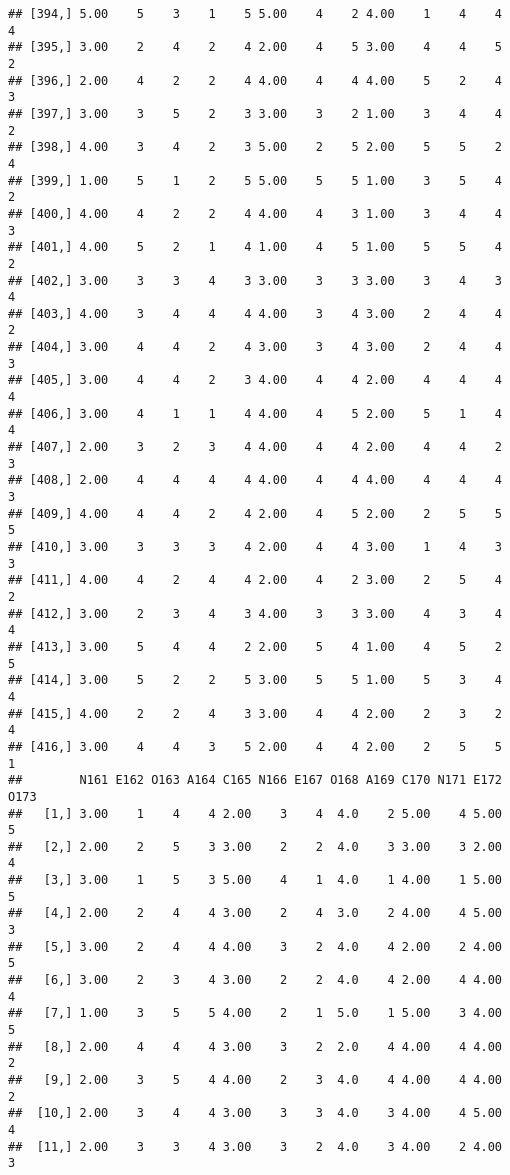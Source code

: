 \documentclass[]{article}
\begin{document}
\begin{verbatim}
## [394,] 5.00    5    3    1    5 5.00    4    2 4.00    1    4    4    4
## [395,] 3.00    2    4    2    4 2.00    4    5 3.00    4    4    5    2
## [396,] 2.00    4    2    2    4 4.00    4    4 4.00    5    2    4    3
## [397,] 3.00    3    5    2    3 3.00    3    2 1.00    3    4    4    2
## [398,] 4.00    3    4    2    3 5.00    2    5 2.00    5    5    2    4
## [399,] 1.00    5    1    2    5 5.00    5    5 1.00    3    5    4    2
## [400,] 4.00    4    2    2    4 4.00    4    3 1.00    3    4    4    3
## [401,] 4.00    5    2    1    4 1.00    4    5 1.00    5    5    4    2
## [402,] 3.00    3    3    4    3 3.00    3    3 3.00    3    4    3    4
## [403,] 4.00    3    4    4    4 4.00    3    4 3.00    2    4    4    2
## [404,] 3.00    4    4    2    4 3.00    3    4 3.00    2    4    4    3
## [405,] 3.00    4    4    2    3 4.00    4    4 2.00    4    4    4    4
## [406,] 3.00    4    1    1    4 4.00    4    5 2.00    5    1    4    4
## [407,] 2.00    3    2    3    4 4.00    4    4 2.00    4    4    2    3
## [408,] 2.00    4    4    4    4 4.00    4    4 4.00    4    4    4    3
## [409,] 4.00    4    4    2    4 2.00    4    5 2.00    2    5    5    5
## [410,] 3.00    3    3    3    4 2.00    4    4 3.00    1    4    3    3
## [411,] 4.00    4    2    4    4 2.00    4    2 3.00    2    5    4    2
## [412,] 3.00    2    3    4    3 4.00    3    3 3.00    4    3    4    4
## [413,] 3.00    5    4    4    2 2.00    5    4 1.00    4    5    2    5
## [414,] 3.00    5    2    2    5 3.00    5    5 1.00    5    3    4    4
## [415,] 4.00    2    2    4    3 3.00    4    4 2.00    2    3    2    4
## [416,] 3.00    4    4    3    5 2.00    4    4 2.00    2    5    5    1
##        N161 E162 O163 A164 C165 N166 E167 O168 A169 C170 N171 E172 O173
##   [1,] 3.00    1    4    4 2.00    3    4  4.0    2 5.00    4 5.00    5
##   [2,] 2.00    2    5    3 3.00    2    2  4.0    3 3.00    3 2.00    4
##   [3,] 3.00    1    5    3 5.00    4    1  4.0    1 4.00    1 5.00    5
##   [4,] 2.00    2    4    4 3.00    2    4  3.0    2 4.00    4 5.00    3
##   [5,] 3.00    2    4    4 4.00    3    2  4.0    4 2.00    2 4.00    5
##   [6,] 3.00    2    3    4 3.00    2    2  4.0    4 2.00    4 4.00    4
##   [7,] 1.00    3    5    5 4.00    2    1  5.0    1 5.00    3 4.00    5
##   [8,] 2.00    4    4    4 3.00    3    2  2.0    4 4.00    4 4.00    2
##   [9,] 2.00    3    5    4 4.00    2    3  4.0    4 4.00    4 4.00    2
##  [10,] 2.00    3    4    4 3.00    3    3  4.0    3 4.00    4 5.00    4
##  [11,] 2.00    3    3    4 3.00    3    2  4.0    3 4.00    2 4.00    3

\end{verbatim}
\end{document}
